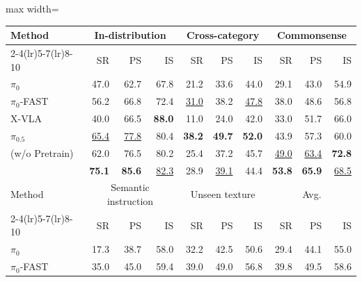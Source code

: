 \begin{center}
\begin{minipage}{\linewidth}
\makeatletter{}\makeatother
    \centering
    \small
    \setlength{\tabcolsep}{4pt}
    \renewcommand{\arraystretch}{1.15}
    \caption{Detailed VLABench results (\%). SR, PS, and IS denote
    success rate, progress score, and intention score, respectively
    (all $\uparrow$).}
    \label{tab:app:vlabench}
    \vspace{3pt}
    \begin{adjustbox}{max width=\linewidth}
    \begin{tabular*}{0.94\linewidth}{@{\extracolsep{\fill}}l*{9}{r}@{}}
        \toprule
        Method & \multicolumn{3}{c}{In-distribution}
        & \multicolumn{3}{c}{Cross-category}
        & \multicolumn{3}{c}{Commonsense} \\
        \cmidrule(lr){2-4}\cmidrule(lr){5-7}\cmidrule(lr){8-10}
        & SR & PS & IS & SR & PS & IS & SR & PS & IS \\
        \midrule
        $\pi_0$ & 47.0 & 62.7 & 67.8 & 21.2 & 33.6 & 44.0 & 29.1 & 43.0 & 54.9 \\
        $\pi_0$-FAST & 56.2 & 66.8 & 72.4 & \underline{31.0} & 38.2 & \underline{47.8} & 38.0 & 48.6 & 56.8 \\
        X-VLA & 40.0 & 66.5 & \textbf{88.0} & 11.0 & 24.0 & 42.0 & 33.0 & 51.7 & 66.0 \\
        $\pi_{0.5}$ & \underline{65.4} & \underline{77.8} & 80.4 & \textbf{38.2} & \textbf{49.7} & \textbf{52.0} & 43.9 & 57.3 & 60.0 \\
        \midrule
        \method{} (w/o Pretrain) & 62.0 & 76.5 & 80.2 & 25.4 & 37.2 & 45.7 & \underline{49.0} & \underline{63.4} & \textbf{72.8} \\
        \method{} & \textbf{75.1} & \textbf{85.6} & \underline{82.3} & 28.9 & \underline{39.1} & 44.4 & \textbf{53.8} & \textbf{65.9} & \underline{68.5} \\
        \midrule
        Method & \multicolumn{3}{c}{Semantic instruction}
        & \multicolumn{3}{c}{Unseen texture}
        & \multicolumn{3}{c}{Avg.} \\
        \cmidrule(lr){2-4}\cmidrule(lr){5-7}\cmidrule(lr){8-10}
        & SR & PS & IS & SR & PS & IS & SR & PS & IS \\
        \midrule
        $\pi_0$ & 17.3 & 38.7 & 58.0 & 32.2 & 42.5 & 50.6 & 29.4 & 44.1 & 55.0 \\
        $\pi_0$-FAST & 35.0 & 45.0 & 59.4 & 39.0 & 49.0 & 56.8 & 39.8 & 49.5 & 58.6 \\

\end{tabular*}
\end{adjustbox}
\end{minipage}
\end{center}
